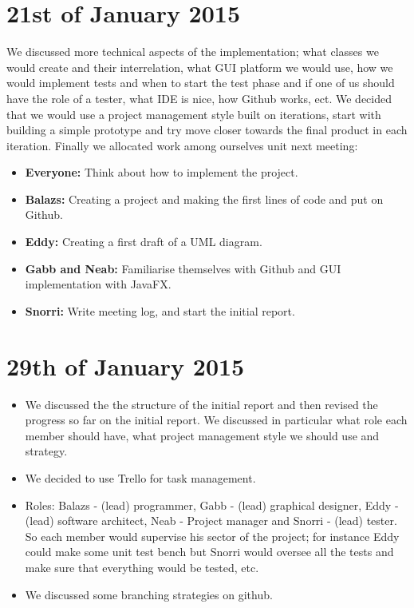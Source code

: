 \documentclass[11pt]{article}
\begin{document}
\section{21st of January 2015}
We discussed more technical aspects of the implementation; what classes we would create and their interrelation, what GUI platform we would use, how we would implement tests and when to start the test phase and if one of us should have the role of a tester, what IDE is nice, how Github works, ect. We decided that we would use a project management style built on iterations, start with building a simple prototype and try move closer towards the final product in each iteration. Finally we allocated work among ourselves unit next meeting:
\begin{itemize}
\item \textbf{Everyone:} Think about how to implement the project.

\item \textbf{Balazs:} Creating a project and making the first lines of code and put on Github.

\item \textbf{Eddy:} Creating a first draft of a UML diagram.

\item \textbf{Gabb and Neab:} Familiarise themselves with Github and GUI implementation with JavaFX.

\item \textbf{Snorri:} Write meeting log, and start the initial report.

\end{itemize} 

\newpage

\section{29th of January 2015}
\begin{itemize}
\item We discussed the the structure of the initial report and then revised the progress so far on the initial report. We discussed in particular what role each member should have, what project management style we should use and strategy.
\item We decided to use Trello for task management.
\item Roles: Balazs - (lead) programmer, Gabb - (lead) graphical designer, Eddy - (lead) software architect, Neab - Project manager and Snorri - (lead) tester. So each member would supervise his sector of the project; for instance Eddy could make some unit test bench but Snorri would oversee all the tests and make sure that everything would be tested, etc.
\item We discussed some branching strategies on github. 
\end{itemize} 

\newpage
\end{document}
